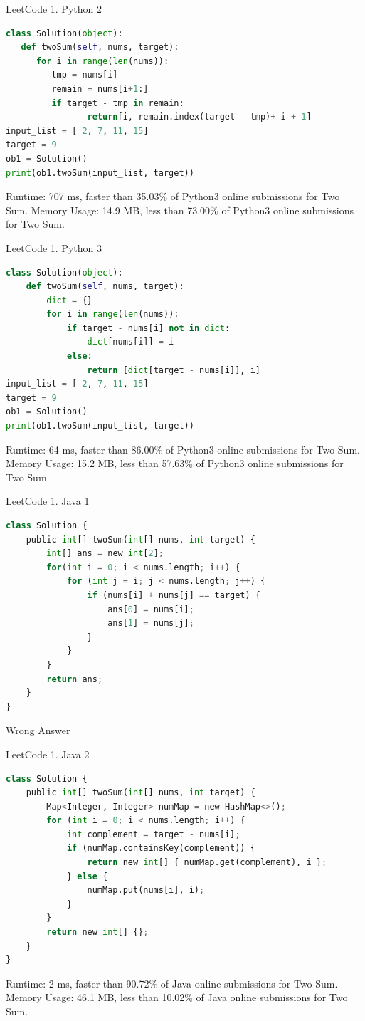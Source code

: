 \documentclass[10pt,UTF8]{ctexart}
\begin{document}
LeetCode 1. Python 2

\begin{lstlisting}[language={python}]
class Solution(object):
   def twoSum(self, nums, target):
      for i in range(len(nums)):
         tmp = nums[i]
         remain = nums[i+1:]
         if target - tmp in remain:
                return[i, remain.index(target - tmp)+ i + 1]
input_list = [ 2, 7, 11, 15]
target = 9
ob1 = Solution()
print(ob1.twoSum(input_list, target))
\end{lstlisting}
Runtime: 707 ms, faster than 35.03\% of Python3 online submissions for Two Sum.
Memory Usage: 14.9 MB, less than 73.00\% of Python3 online submissions for Two Sum.

LeetCode 1. Python 3

\begin{lstlisting}[language={python}]
class Solution(object):
    def twoSum(self, nums, target):
        dict = {}
        for i in range(len(nums)):
            if target - nums[i] not in dict:
                dict[nums[i]] = i
            else:
                return [dict[target - nums[i]], i]
input_list = [ 2, 7, 11, 15]
target = 9
ob1 = Solution()
print(ob1.twoSum(input_list, target))
\end{lstlisting}
Runtime: 64 ms, faster than 86.00\% of Python3 online submissions for Two Sum.
Memory Usage: 15.2 MB, less than 57.63\% of Python3 online submissions for Two Sum.

LeetCode 1. Java 1

\begin{lstlisting}[language={python}]
class Solution {
    public int[] twoSum(int[] nums, int target) {
        int[] ans = new int[2];
        for(int i = 0; i < nums.length; i++) {
            for (int j = i; j < nums.length; j++) {
                if (nums[i] + nums[j] == target) {
                    ans[0] = nums[i];
                    ans[1] = nums[j];
                }                
            }
        }
        return ans;
    }
}
\end{lstlisting}
Wrong Answer

LeetCode 1. Java 2

\begin{lstlisting}[language={python}]
class Solution {
    public int[] twoSum(int[] nums, int target) {
        Map<Integer, Integer> numMap = new HashMap<>();
        for (int i = 0; i < nums.length; i++) {
            int complement = target - nums[i];
            if (numMap.containsKey(complement)) {
                return new int[] { numMap.get(complement), i };
            } else {
                numMap.put(nums[i], i);
            }
        }
        return new int[] {};    
    }
}
\end{lstlisting}
Runtime: 2 ms, faster than 90.72\% of Java online submissions for Two Sum.
Memory Usage: 46.1 MB, less than 10.02\% of Java online submissions for Two Sum.
\end{document}
